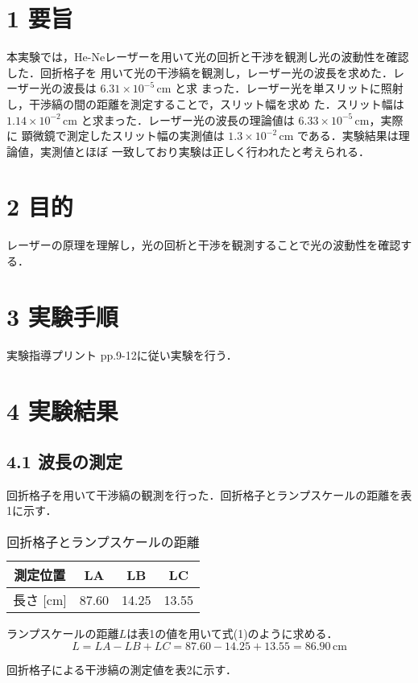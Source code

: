 \documentclass[a4paper,11pt,dvipdfmx]{jsarticle}
\begin{document}
\section*{1 要旨}
本実験では，He-Neレーザーを用いて光の回折と干渉を観測し光の波動性を確認した．回折格子を
用いて光の干渉縞を観測し，レーザー光の波長を求めた．レーザー光の波長は $6.31 \times 10^{-5}\,\mathrm{cm}$ と求
まった．レーザー光を単スリットに照射し，干渉縞の間の距離を測定することで，スリット幅を求め
た．スリット幅は $1.14\times 10^{-2}\,\mathrm{cm}$ と求まった．レーザー光の波長の理論値は $6.33\times 10^{-5}\,\mathrm{cm}$，実際に
顕微鏡で測定したスリット幅の実測値は $1.3 \times 10^{-2}\,\mathrm{cm}$ である．実験結果は理論値，実測値とほぼ
一致しており実験は正しく行われたと考えられる．

\section*{2 目的}
レーザーの原理を理解し，光の回析と干渉を観測することで光の波動性を確認する．

\section*{3 実験手順}
実験指導プリント pp.9-12に従い実験を行う．

\section*{4 実験結果}

\subsection*{4.1 波長の測定}
回折格子を用いて干渉縞の観測を行った．回折格子とランプスケールの距離を表1に示す．

\begin{table}[H]
\centering
\caption{回折格子とランプスケールの距離}
\begin{tabular}{c|c c c}
\hline
測定位置 & LA & LB & LC \\ \hline
長さ [cm] & 87.60 & 14.25 & 13.55 \\
\hline
\end{tabular}
\end{table}

ランプスケールの距離$L$は表1の値を用いて式(1)のように求める．
\[
L = LA - LB + LC = 87.60 - 14.25 + 13.55 = 86.90\,\mathrm{cm}
\tag{1}
\]

回折格子による干渉縞の測定値を表2に示す．
\end{document}

